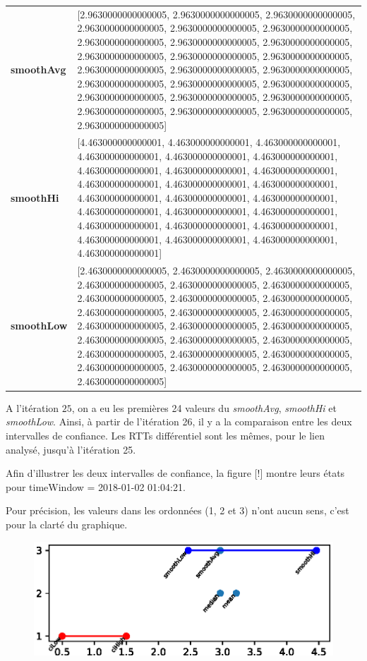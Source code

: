 						\begin{table}[H]
							\centering
							\begin{tabularx}{\textwidth}{lX}
		\textbf{smoothAvg}&  [2.9630000000000005, 2.9630000000000005, 2.9630000000000005, 2.9630000000000005, 2.9630000000000005, 2.9630000000000005, 2.9630000000000005, 2.9630000000000005, 2.9630000000000005, 2.9630000000000005, 2.9630000000000005, 2.9630000000000005, 2.9630000000000005, 2.9630000000000005, 2.9630000000000005, 2.9630000000000005, 2.9630000000000005, 2.9630000000000005, 2.9630000000000005, 2.9630000000000005, 2.9630000000000005, 2.9630000000000005, 2.9630000000000005, 2.9630000000000005, 2.9630000000000005] \\
		\textbf{smoothHi}& [4.463000000000001, 4.463000000000001, 4.463000000000001, 4.463000000000001, 4.463000000000001, 4.463000000000001, 4.463000000000001, 4.463000000000001, 4.463000000000001, 4.463000000000001, 4.463000000000001, 4.463000000000001, 4.463000000000001, 4.463000000000001, 4.463000000000001, 4.463000000000001, 4.463000000000001, 4.463000000000001, 4.463000000000001, 4.463000000000001, 4.463000000000001, 4.463000000000001, 4.463000000000001, 4.463000000000001, 4.463000000000001] \\
		\textbf{smoothLow} &[2.4630000000000005, 2.4630000000000005, 2.4630000000000005, 2.4630000000000005, 2.4630000000000005, 2.4630000000000005, 2.4630000000000005, 2.4630000000000005, 2.4630000000000005, 2.4630000000000005, 2.4630000000000005, 2.4630000000000005, 2.4630000000000005, 2.4630000000000005, 2.4630000000000005, 2.4630000000000005, 2.4630000000000005, 2.4630000000000005, 2.4630000000000005, 2.4630000000000005, 2.4630000000000005, 2.4630000000000005, 2.4630000000000005, 2.4630000000000005, 2.4630000000000005]
		\\
	\end{tabularx} 
\end{table}


A l'itération $25$, on a eu les premières 24 valeurs du \textit{smoothAvg}, \textit{smoothHi} et \textit{smoothLow}. Ainsi, à partir de l'itération 26, il y a la comparaison entre les deux intervalles de confiance. Les RTTs différentiel sont les mêmes, pour le lien analysé, jusqu'à l'itération  25. 

Afin d'illustrer les deux intervalles de confiance, la figure [!] montre leurs états pour timeWindow = 2018-01-02 01:04:21.

Pour précision, les valeurs dans les ordonnées (1, 2 et 3) n'ont aucun sens, c'est pour la clarté du graphique.
\begin{figure}[H]
\centering
\includegraphics[width=0.7\linewidth]{illustrations/conf}
\caption{}
\label{fig:conf}
\end{figure}


